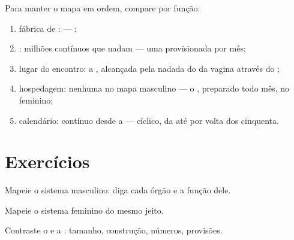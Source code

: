 \begin{method}\label{met:g8:reproductive-systems:sides}
Para manter o mapa em ordem, compare por função:
\begin{enumerate}
  \item fábrica de :  --- ;
  \item {}: milhões contínuos que nadam --- uma 
        provisionada por mês;
  \item lugar do encontro: a , alcançada pela nadada do
         da vagina através do ;
  \item hospedagem: nenhuma no mapa masculino --- o , preparado
        todo mês, no feminino;
  \item calendário: contínuo desde a  --- cíclico, da
         até por volta dos cinquenta.
\end{enumerate}
\end{method}

\section{Exercícios}

\begin{exercise}[$\star$]\label{exo:g8:reproductive-systems:1}
Mapeie o sistema masculino: diga cada órgão e a função dele.
\end{exercise}

\begin{exercise}[$\star$]\label{exo:g8:reproductive-systems:2}
Mapeie o sistema feminino do mesmo jeito.
\end{exercise}

\begin{exercise}[$\star$]\label{exo:g8:reproductive-systems:3}
Contraste o  e a : tamanho,
construção, números, provisões.
\end{exercise}

